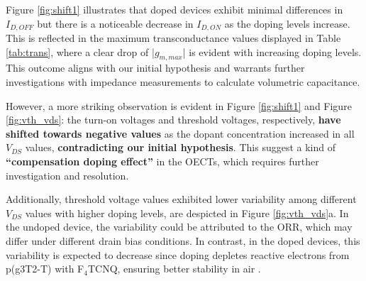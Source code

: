 Figure \ref{fig:shift1} illustrates that doped devices exhibit minimal differences in $I_{D,OFF}$ but  there is a noticeable decrease in $I_{D,ON}$ as the doping levels increase. This is reflected in the maximum transconductance values displayed in Table \ref{tab:trans}, where a clear drop of |$g_{m,max}$| is evident with increasing doping levels. This outcome aligns with our initial hypothesis and warrants further investigations with impedance measurements to calculate volumetric capacitance. %


However, a more striking observation is evident in Figure \ref{fig:shift1} and Figure \ref{fig:vth_vds}: the turn-on voltages and threshold voltages, respectively, \textbf{have shifted towards negative values} as the dopant concentration increased in all $V_{DS}$ values, \textbf{contradicting our initial hypothesis}. This suggest a kind of \textbf{``compensation doping effect''} in the OECTs, which requires further investigation and resolution. %

Additionally, threshold voltage values exhibited lower variability among different $V_{DS}$ values with higher doping levels, are despicted in Figure \ref{fig:vth_vds}a.  In the undoped device, the variability could be attributed to the ORR, which may differ under different drain bias conditions. In contrast, in the doped devices, this variability is expected to decrease since doping depletes reactive electrons from p(g3T2-T) with F$_{4}$TCNQ, ensuring better stability in air \cite{tanTuningOrganicElectrochemical2022}. %

